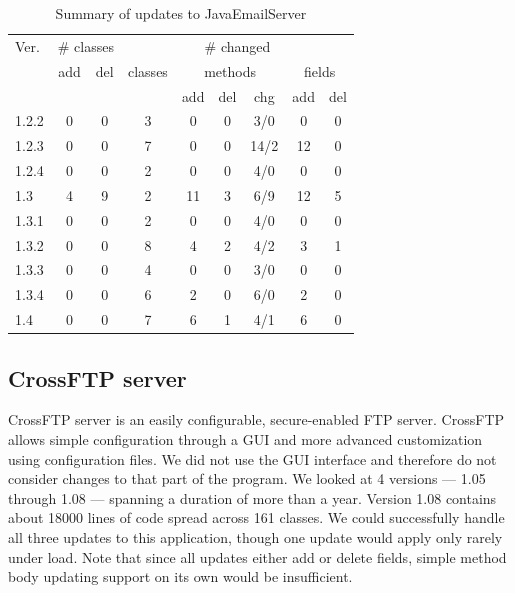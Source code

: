 \begin{table}
\begin{footnotesize}
\begin{center}
\begin{tabular}{|l||c|c||c|c|c|c|c|c|} \hline
Ver.   & \multicolumn{2}{c||}{\# classes} &    \multicolumn{6}{c|}{\# changed} \\
       & add & del & classes & \multicolumn{3}{c|}{methods} & \multicolumn{2}{c|}{fields} \\
       &     &     &         & add & del & chg   & add & del \\ \hline \hline
1.2.2  & 0   & 0   & 3       & 0   & 0   & 3/0   & 0   & 0   \\
1.2.3  & 0   & 0   & 7       & 0   & 0   & 14/2  & 12  & 0   \\
1.2.4  & 0   & 0   & 2       & 0   & 0   & 4/0   & 0   & 0   \\
1.3    & 4   & 9   & 2       & 11  & 3   & 6/9   & 12  & 5   \\
1.3.1  & 0   & 0   & 2       & 0   & 0   & 4/0   & 0   & 0   \\
1.3.2  & 0   & 0   & 8       & 4   & 2   & 4/2   & 3   & 1   \\
1.3.3  & 0   & 0   & 4       & 0   & 0   & 3/0   & 0   & 0   \\
1.3.4  & 0   & 0   & 6       & 2   & 0   & 6/0   & 2   & 0   \\
1.4    & 0   & 0   & 7       & 6   & 1   & 4/1   & 6   & 0   \\ \hline
\end{tabular}
\end{center}
\end{footnotesize}
\caption{Summary of updates to JavaEmailServer}
\label{tab:jes-changes}
\end{table}

% 
%

\subsection{CrossFTP server}
\label{subsec:crossftp}
CrossFTP server is an easily configurable, secure-enabled FTP server.
CrossFTP allows simple configuration through a GUI and more advanced
customization using configuration files. We did not use the GUI interface
and therefore do not consider changes to that part of the program.  We
looked at 4 versions --- 1.05 through 1.08 --- spanning a duration of more
than a year. Version 1.08 contains about 18000 lines of code spread across
161 classes. We could successfully handle all three updates to this
application, though one update would apply only rarely under
load. Note that since all updates either add or delete fields, simple 
method body updating support on its own would be insufficient.

